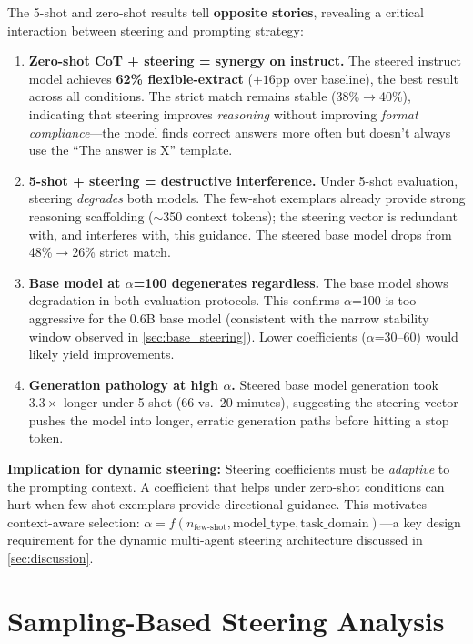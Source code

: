 \documentclass[11pt,a4paper]{article}
\begin{document}
The 5-shot and zero-shot results tell \textbf{opposite stories}, revealing a critical interaction between steering and prompting strategy:

\begin{enumerate}
    \item \textbf{Zero-shot CoT + steering = synergy on instruct.} The steered instruct model achieves \textbf{62\% flexible-extract} ($+16$pp over baseline), the best result across all conditions. The strict match remains stable (38\%$\to$40\%), indicating that steering improves \textit{reasoning} without improving \textit{format compliance}---the model finds correct answers more often but doesn't always use the ``The answer is X'' template.
    \item \textbf{5-shot + steering = destructive interference.} Under 5-shot evaluation, steering \textit{degrades} both models. The few-shot exemplars already provide strong reasoning scaffolding ($\sim$350 context tokens); the steering vector is redundant with, and interferes with, this guidance. The steered base model drops from 48\%$\to$26\% strict match.
    \item \textbf{Base model at $\alpha$=100 degenerates regardless.} The base model shows degradation in both evaluation protocols. This confirms $\alpha$=100 is too aggressive for the 0.6B base model (consistent with the narrow stability window observed in \cref{sec:base_steering}). Lower coefficients ($\alpha$=30--60) would likely yield improvements.
    \item \textbf{Generation pathology at high $\alpha$.} Steered base model generation took $3.3\times$ longer under 5-shot (66 vs.\ 20 minutes), suggesting the steering vector pushes the model into longer, erratic generation paths before hitting a stop token.
\end{enumerate}

\textbf{Implication for dynamic steering:} Steering coefficients must be \textit{adaptive} to the prompting context. A coefficient that helps under zero-shot conditions can hurt when few-shot exemplars provide directional guidance. This motivates context-aware selection: $\alpha = f(n_{\text{few-shot}}, \text{model\_type}, \text{task\_domain})$---a key design requirement for the dynamic multi-agent steering architecture discussed in \cref{sec:discussion}.

\section{Sampling-Based Steering Analysis}
\label{sec:sampling}
\end{document}
